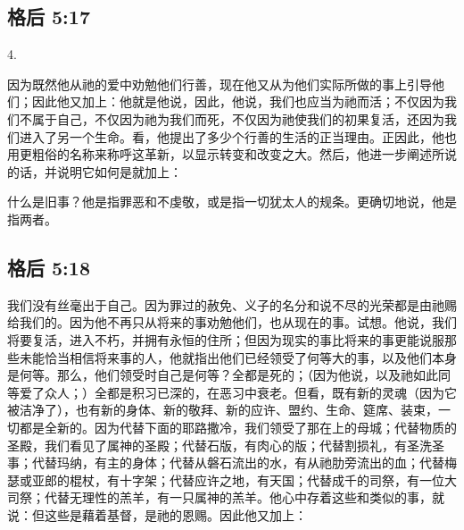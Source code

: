 
\subsection{格后 5:17}

4. \par

因为既然他从祂的爱中劝勉他们行善，现在他又从为他们实际所做的事上引导他们；因此他又加上：他就是他说，因此，他说，我们也应当为祂而活；不仅因为我们不属于自己，不仅因为祂为我们而死，不仅因为祂使我们的初果复活，还因为我们进入了另一个生命。看，他提出了多少个行善的生活的正当理由。正因此，他也用更粗俗的名称来称呼这革新，以显示转变和改变之大。然后，他进一步阐述所说的话，并说明它如何是就加上：\par

什么是旧事？他是指罪恶和不虔敬，或是指一切犹太人的规条。更确切地说，他是指两者。\par


\subsection{格后 5:18}

\par

我们没有丝毫出于自己。因为罪过的赦免、义子的名分和说不尽的光荣都是由祂赐给我们的。因为他不再只从将来的事劝勉他们，也从现在的事。试想。他说，我们将要复活，进入不朽，并拥有永恒的住所；但因为现实的事比将来的事更能说服那些未能恰当相信将来事的人，他就指出他们已经领受了何等大的事，以及他们本身是何等。那么，他们领受时自己是何等？全都是死的；（因为他说，以及祂如此同等爱了众人；）全都是积习已深的，在恶习中衰老。但看，既有新的灵魂（因为它被洁净了），也有新的身体、新的敬拜、新的应许、盟约、生命、筵席、装束，一切都是全新的。因为代替下面的耶路撒冷，我们领受了那在上的母城；代替物质的圣殿，我们看见了属神的圣殿；代替石版，有肉心的版；代替割损礼，有圣洗圣事；代替玛纳，有主的身体；代替从磐石流出的水，有从祂肋旁流出的血；代替梅瑟或亚郎的棍杖，有十字架；代替应许之地，有天国；代替成千的司祭，有一位大司祭；代替无理性的羔羊，有一只属神的羔羊。他心中存着这些和类似的事，就说：但这些是藉着基督，是祂的恩赐。因此他又加上：\par

